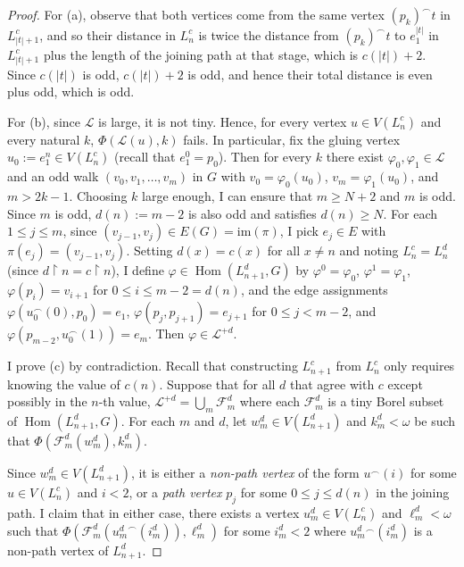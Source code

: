 \documentclass[10pt,a4paper]{amsart}
\DeclareMathOperator{\Hom}{Hom}
\begin{document}
\begin{proof}
    For (a), observe that both vertices come from the same vertex $(p_k)^\smallfrown t$ in $L^c_{|t|+1}$, and so their distance in $L^c_n$ is twice the distance from $(p_k)^\smallfrown t$ to $e_1^{|t|}$ in $L^c_{|t|+1}$ plus the length of the joining path at that stage, which is $c(|t|)+2$.
    Since $c(|t|)$ is odd, $c(|t|)+2$ is odd, and hence their total distance is even plus odd, which is odd.

    For (b), since $\mathcal L$ is large, it is not tiny.
    Hence, for every vertex $u\in V(L^c_n)$ and every natural $k$, $\Phi(\mathcal L(u),k)$ fails.
    In particular, fix the gluing vertex $u_0:=e_1^n\in V(L^c_n)$ (recall that $e_1^0=p_0$).
    Then for every $k$ there exist $\varphi_0,\varphi_1\in\mathcal L$ and an odd walk $(v_0,v_1,\dots,v_m)$ in $G$ with $v_0=\varphi_0(u_0)$, $v_m=\varphi_1(u_0)$, and $m>2k-1$.
    Choosing $k$ large enough, I can ensure that $m\geq N+2$ and $m$ is odd.
    Since $m$ is odd, $d(n):=m-2$ is also odd and satisfies $d(n)\geq N$.
    For each $1\leq j\leq m$, since $(v_{j-1},v_j)\in E(G)=\mathrm{im}(\pi)$, I pick $e_j\in E$ with $\pi(e_j)=(v_{j-1},v_j)$.
    Setting $d(x)=c(x)$ for all $x\neq n$ and noting $L^c_n=L^d_n$ (since $d\restriction n=c\restriction n$), I define $\varphi\in\Hom(L_{n+1}^d,G)$ by $\varphi^0=\varphi_0$, $\varphi^1=\varphi_1$, $\varphi(p_i)=v_{i+1}$ for $0\leq i\leq m-2=d(n)$, and the edge assignments $\varphi(u_0^\frown (0),p_0)=e_1$, $\varphi(p_j,p_{j+1})=e_{j+1}$ for $0\leq j<m-2$, and $\varphi(p_{m-2},u_0^\frown (1))=e_m$.
    Then $\varphi\in\mathcal L^{+d}$.

    I prove (c) by contradiction.
    Recall that constructing $L^c_{n+1}$ from $L^c_n$ only requires knowing the value of $c(n)$.
    Suppose that for all $d$ that agree with $c$ except possibly in the $n$-th value, $\mathcal L^{+d}=\bigcup_m\mathcal F^d_m$ where each $\mathcal F^d_m$ is a tiny Borel subset of $\Hom(L^d_{n+1},G)$.
    For each $m$ and $d$, let $w^d_m\in V(L^d_{n+1})$ and $k^d_m<\omega$ be such that $\Phi(\mathcal F^d_m(w^d_m),k^d_m)$.
    
    Since $w^d_m\in V(L^d_{n+1})$, it is either a \emph{non-path vertex} of the form $u^\smallfrown(i)$ for some $u\in V(L^c_n)$ and $i<2$, or a \emph{path vertex} $p_j$ for some $0\leq j\leq d(n)$ in the joining path.
    I claim that in either case, there exists a vertex $u^d_m\in V(L^c_n)$ and $\ell^d_m<\omega$ such that $\Phi(\mathcal F^d_m({u^d_m}^\smallfrown(i^d_m)),\ell^d_m)$ for some $i^d_m<2$ where $u^d_m{}^\smallfrown(i^d_m)$ is a non-path vertex of $L^d_{n+1}$.


\end{proof}
\end{document}
